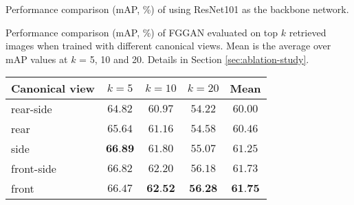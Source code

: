 \documentclass[runningheads]{llncs}
\begin{document}
\renewcommand{\arraystretch}{0.95}
	\centering
    \small
    	\caption{Performance comparison (mAP, \%) of using ResNet101 as the backbone network.}
	\label{tbl:map-compare-resnet}
%
	\caption{Performance comparison (mAP, \%) of FGGAN evaluated on top $k$ retrieved images when trained with different canonical views. Mean is the average over mAP values at $k$ = 5, 10 and 20. Details in Section \ref{sec:ablation-study}.}
	\label{tbl:multi-view}
	\begin{tabular*}{\columnwidth}{@{}@{\extracolsep{\fill}}lcccc@{}}
	\hline
	Canonical view  & $k = 5$ &  $k = 10$ & $k = 20$ & Mean\\
	\hline
    rear-side & $64.82$ & $60.97$ & $54.22$ & $60.00$\\
    rear & $65.64$ & $61.16$ & $54.58$ & $60.46$\\
    side & $\textbf{66.89}$ & $61.80$ & $55.07$ & $61.25$\\
    front-side & $66.82$ & $62.20$ & $56.18$ & $61.73$\\
    front & $66.47$ & $\textbf{62.52}$ & $\textbf{56.28}$ & $\textbf{61.75}$\\
	\hline
	\end{tabular*}
\end{document}
